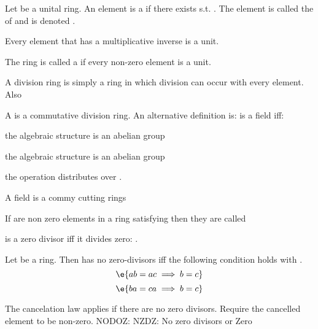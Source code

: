 \begin{D} Let  be a unital ring. An element  is a  if there exists  s.t. . The element  is called the  of  and is denoted .
\end{D}
\begin{R} Every element that has a multiplicative inverse is a unit.  \end{R}
\begin{D} The ring  is called a  if every non-zero element is a unit. \end{D}
\begin{R} A division ring is simply a ring in which division can occur with every element. Also  \end{R}
\begin{D} A  is a commutative division ring. An alternative definition is:
 is a field iff:\begin{compactitem}
\item the algebraic structure  is an abelian group
\item the algebraic structure  is an abelian group
\item the operation \e{$\times$} distributes over \e{$+$}.
\end{compactitem}
\end{D}
\begin{R} A field is a commy cutting rings \end{R}
\begin{D} If  are non zero elements in a ring  satisfying  then they are called  \end{D}
\begin{R}  is a zero divisor iff it divides zero: . \end{R}
\begin{Le} Let  be a ring. Then  has no zero-divisors iff the following condition holds  with .
$$\e{ab=ac \implies b=c}$$
$$\e{ba=ca \implies b=c}$$
\end{Le}
\begin{R} The cancelation law applies if there are no zero divisors. Require the cancelled element to be non-zero. NODOZ: NZDZ: No zero divisors or Zero \end{R}

